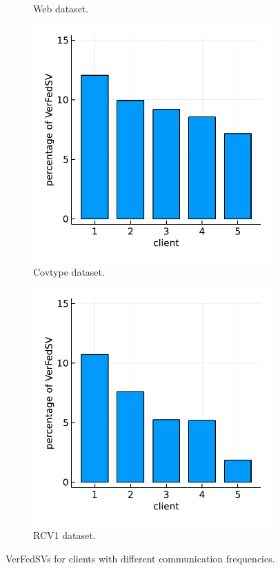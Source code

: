 \begin{figure}[t]
\begin{subfigure}{.24\textwidth}
  \caption{Web dataset.}
  \label{fig:asyn_same_feature_web}
\end{subfigure} 
\begin{subfigure}{.24\textwidth}
  \centering
  \includegraphics[width=\linewidth]{./figures/asyn_same_features_covtype.pdf}
  \caption{Covtype dataset.}
  \label{fig:asyn_same_feature_covtype}
\end{subfigure}
\begin{subfigure}{.24\textwidth}
  \centering
  \includegraphics[width=\linewidth]{./figures/asyn_same_features_rcv1.pdf}
  \caption{RCV1 dataset.}
  \label{fig:asyn_same_feature_rcv1}
\end{subfigure}
\caption{VerFedSVs for clients with different communication frequencies.}
\label{fig:asyn_same_feature}
\end{figure}


